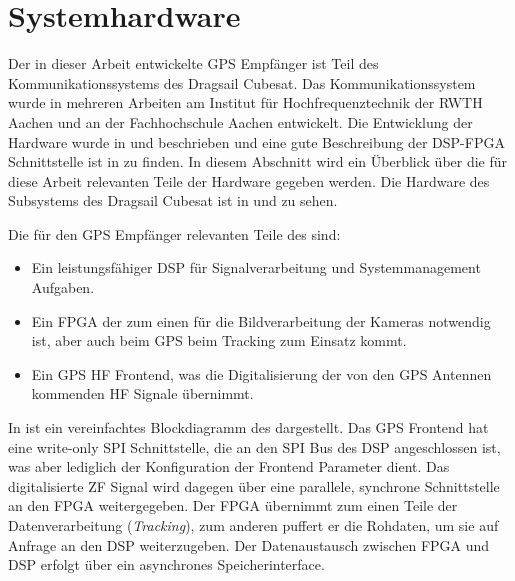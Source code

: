 \section{Systemhardware}
Der in dieser Arbeit entwickelte GPS Empfänger ist Teil des Kommunikationssystems des Dragsail Cubesat. Das Kommunikationssystem wurde in mehreren Arbeiten am Institut für Hochfrequenztechnik der RWTH Aachen und an der Fachhochschule Aachen entwickelt. Die Entwicklung der \comboard Hardware wurde in \cite{DragsailKaiMA} und \cite{DragsailMattiMA} beschrieben und eine gute Beschreibung der DSP-FPGA Schnittstelle ist in \cite{DragsailAndrejMA} zu finden.
In diesem Abschnitt wird ein Überblick über die für diese Arbeit relevanten Teile der \comboard Hardware gegeben werden. Die Hardware des \comboard Subsystems des Dragsail Cubesat ist in  und  zu sehen. 

Die für den GPS Empfänger relevanten Teile des \comboard sind: 
\begin{itemize}
\item Ein leistungsfähiger \gls{DSP} für Signalverarbeitung und Systemmanagement Aufgaben.
\item Ein \gls{FPGA} der zum einen für die Bildverarbeitung der Kameras notwendig ist, aber auch beim GPS beim Tracking zum Einsatz kommt.
\item Ein GPS HF Frontend, was die Digitalisierung der von den GPS Antennen kommenden HF Signale übernimmt.
\end{itemize}



In  ist ein vereinfachtes Blockdiagramm des \comboard dargestellt. Das GPS Frontend hat eine write-only SPI Schnittstelle, die an den SPI Bus des DSP angeschlossen ist, was aber lediglich der Konfiguration der Frontend Parameter dient. Das digitalisierte \gls{ZF} Signal wird dagegen über eine parallele, synchrone Schnittstelle an den FPGA weitergegeben. Der FPGA übernimmt zum einen Teile der Datenverarbeitung (\emph{Tracking}), zum anderen puffert er die Rohdaten, um sie auf Anfrage an den DSP weiterzugeben. Der Datenaustausch zwischen FPGA und DSP erfolgt über ein asynchrones Speicherinterface. 


